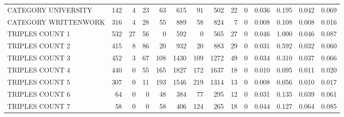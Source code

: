 \begin{tabular}{lrrrrrrrrrllll}
 CATEGORY UNIVERSITY      &             142 &             4 &              23 &              63 &             615 &   91 &  502 &   22 &    0 & 0.036 & 0.195 & 0.042 & 0.069 \\
 CATEGORY WRITTENWORK     &             316 &             4 &              28 &              55 &             889 &   58 &  824 &    7 &    0 & 0.008 & 0.108 & 0.008 & 0.016 \\
 TRIPLES COUNT 1          &             532 &            27 &              56 &               0 &             592 &    0 &  565 &   27 &    0 & 0.046 & 1.000 & 0.046 & 0.087 \\
 TRIPLES COUNT 2          &             415 &             8 &              86 &              20 &             932 &   20 &  883 &   29 &    0 & 0.031 & 0.592 & 0.032 & 0.060 \\
 TRIPLES COUNT 3          &             452 &             3 &              67 &             108 &            1430 &  109 & 1272 &   49 &    0 & 0.034 & 0.310 & 0.037 & 0.066 \\
 TRIPLES COUNT 4          &             440 &             0 &              55 &             165 &            1827 &  172 & 1637 &   18 &    0 & 0.010 & 0.095 & 0.011 & 0.020 \\
 TRIPLES COUNT 5          &             307 &             0 &              11 &             193 &            1546 &  219 & 1314 &   13 &    0 & 0.008 & 0.056 & 0.010 & 0.017 \\
 TRIPLES COUNT 6          &              64 &             0 &               0 &              48 &             384 &   77 &  295 &   12 &    0 & 0.031 & 0.135 & 0.039 & 0.061 \\
 TRIPLES COUNT 7          &              58 &             0 &               0 &              58 &             406 &  124 &  265 &   18 &    0 & 0.044 & 0.127 & 0.064 & 0.085 \\
\hline
\end{tabular}